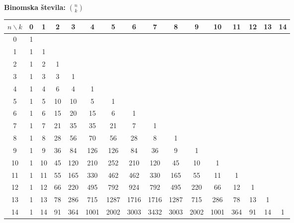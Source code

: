 \documentclass[a4paper, oneside, 10pt]{article}
\theoremstyle{definition}
\begin{document}
{\footnotesize

\textbf{Binomska števila:} $\binom{n}{k}$ \\
\begin{tabular}{|*{16}{c|}}
  \hline
  $n \backslash k$ & 0&1&2&3&4&5&6&7&8&9&10&11&12&13&14\\ \hline
  0 & 1 &  &  &  &  &  &  &  &  &  &  &  &  &  & \\ \hline
  1 & 1 & 1 &  &  &  &  &  &  &  &  &  &  &  &  & \\ \hline
  2 & 1 & 2 & 1 &  &  &  &  &  &  &  &  &  &  &  & \\ \hline
  3 & 1 & 3 & 3 & 1 &  &  &  &  &  &  &  &  &  &  & \\ \hline
  4 & 1 & 4 & 6 & 4 & 1 &  &  &  &  &  &  &  &  &  & \\ \hline
  5 & 1 & 5 & 10 & 10 & 5 & 1 &  &  &  &  &  &  &  &  & \\ \hline
  6 & 1 & 6 & 15 & 20 & 15 & 6 & 1 &  &  &  &  &  &  &  & \\ \hline
  7 & 1 & 7 & 21 & 35 & 35 & 21 & 7 & 1 &  &  &  &  &  &  & \\ \hline
  8 & 1 & 8 & 28 & 56 & 70 & 56 & 28 & 8 & 1 &  &  &  &  &  & \\ \hline
  9 & 1 & 9 & 36 & 84 & 126 & 126 & 84 & 36 & 9 & 1 &  &  &  &  & \\ \hline
  10 & 1 & 10 & 45 & 120 & 210 & 252 & 210 & 120 & 45 & 10 & 1 &  &  &  & \\ \hline
  11 & 1 & 11 & 55 & 165 & 330 & 462 & 462 & 330 & 165 & 55 & 11 & 1 &  &  & \\ \hline
  12 & 1 & 12 & 66 & 220 & 495 & 792 & 924 & 792 & 495 & 220 & 66 & 12 & 1 &  & \\ \hline
  13 & 1 & 13 & 78 & 286 & 715 & 1287 & 1716 & 1716 & 1287 & 715 & 286 & 78 & 13 & 1 & \\ \hline
  14 & 1 & 14 & 91 & 364 & 1001 & 2002 & 3003 & 3432 & 3003 & 2002 & 1001 & 364 & 91 & 14 & 1\\ \hline
\end{tabular}

}
\end{document}
